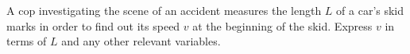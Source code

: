 A cop investigating the scene of an accident measures
the length $L$ of a car's skid marks in order to find out
its speed $v$ at the beginning of the skid. Express $v$ in
terms of $L$ and any other relevant variables.\answercheck
